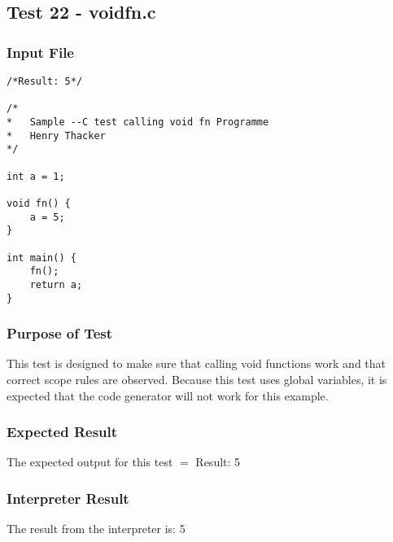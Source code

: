 \subsection{Test 22 - voidfn.c}
\subsubsection{Input File}
\begin{lstlisting}[showstringspaces=false,breaklines=true,backgroundcolor=\color{light-gray}, captionpos=b]
/*Result: 5*/

/*
*	Sample --C test calling void fn Programme
*	Henry Thacker
*/

int a = 1;

void fn() {
	a = 5;
}

int main() {
	fn();
	return a;
}
\end{lstlisting}\subsubsection{Purpose of Test}
This test is designed to make sure that calling void functions work and that correct scope rules are observed. Because this test uses global variables, it is expected that the code generator will not work for this example.

\subsubsection{Expected Result}
The expected output for this test $=$ Result: 5
\subsubsection{Interpreter Result}
The result from the interpreter is: 5
